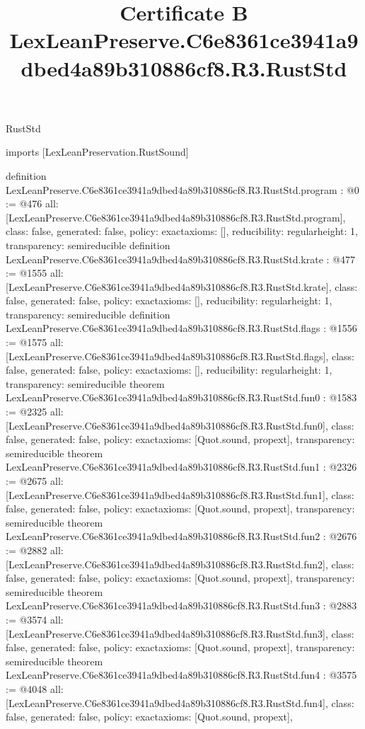 \begin{lexlean}{RustStd}
\title{Certificate B LexLeanPreserve.C6e8361ce3941a9dbed4a89b310886cf8.R3.RustStd}
\begin{coremodule}
imports [LexLeanPreservation.RustSound]

definition LexLeanPreserve.C6e8361ce3941a9dbed4a89b310886cf8.R3.RustStd.program : @0 := @476 {
  all: [LexLeanPreserve.C6e8361ce3941a9dbed4a89b310886cf8.R3.RustStd.program],
  class: false,
  generated: false,
  policy: exact{axioms: []},
  reducibility: regular{height: 1},
  transparency: semireducible
}
definition LexLeanPreserve.C6e8361ce3941a9dbed4a89b310886cf8.R3.RustStd.krate : @477 := @1555 {
  all: [LexLeanPreserve.C6e8361ce3941a9dbed4a89b310886cf8.R3.RustStd.krate],
  class: false,
  generated: false,
  policy: exact{axioms: []},
  reducibility: regular{height: 1},
  transparency: semireducible
}
definition LexLeanPreserve.C6e8361ce3941a9dbed4a89b310886cf8.R3.RustStd.flags : @1556 := @1575 {
  all: [LexLeanPreserve.C6e8361ce3941a9dbed4a89b310886cf8.R3.RustStd.flags],
  class: false,
  generated: false,
  policy: exact{axioms: []},
  reducibility: regular{height: 1},
  transparency: semireducible
}
theorem LexLeanPreserve.C6e8361ce3941a9dbed4a89b310886cf8.R3.RustStd.fun0 : @1583 := @2325 {
  all: [LexLeanPreserve.C6e8361ce3941a9dbed4a89b310886cf8.R3.RustStd.fun0],
  class: false,
  generated: false,
  policy: exact{axioms: [Quot.sound, propext]},
  transparency: semireducible
}
theorem LexLeanPreserve.C6e8361ce3941a9dbed4a89b310886cf8.R3.RustStd.fun1 : @2326 := @2675 {
  all: [LexLeanPreserve.C6e8361ce3941a9dbed4a89b310886cf8.R3.RustStd.fun1],
  class: false,
  generated: false,
  policy: exact{axioms: [Quot.sound, propext]},
  transparency: semireducible
}
theorem LexLeanPreserve.C6e8361ce3941a9dbed4a89b310886cf8.R3.RustStd.fun2 : @2676 := @2882 {
  all: [LexLeanPreserve.C6e8361ce3941a9dbed4a89b310886cf8.R3.RustStd.fun2],
  class: false,
  generated: false,
  policy: exact{axioms: [Quot.sound, propext]},
  transparency: semireducible
}
theorem LexLeanPreserve.C6e8361ce3941a9dbed4a89b310886cf8.R3.RustStd.fun3 : @2883 := @3574 {
  all: [LexLeanPreserve.C6e8361ce3941a9dbed4a89b310886cf8.R3.RustStd.fun3],
  class: false,
  generated: false,
  policy: exact{axioms: [Quot.sound, propext]},
  transparency: semireducible
}
theorem LexLeanPreserve.C6e8361ce3941a9dbed4a89b310886cf8.R3.RustStd.fun4 : @3575 := @4048 {
  all: [LexLeanPreserve.C6e8361ce3941a9dbed4a89b310886cf8.R3.RustStd.fun4],
  class: false,
  generated: false,
  policy: exact{axioms: [Quot.sound, propext]},
}
\end{coremodule}
\end{lexlean}
